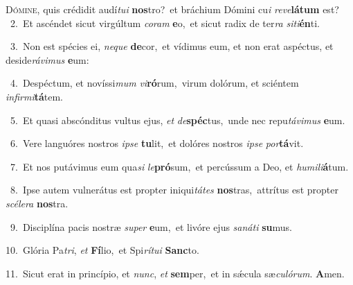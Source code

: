 \lettrine{\initial\textcolor{\initialcolor}{D}}{ómine,} quis crédidit audí\-\textit{tu}\-\textit{i} \textbf{nos}\-tro?~\star et bráchium Dómini cu\textit{i} \textit{re}\-\textit{ve}\textbf{lá}\textbf{tum} est?\\
{\numbfont\textcolor{\numbcolor}{~2.}}~Et ascéndet sicut virgúltum \textit{co}\-\textit{ram} \textbf{e}\-o,~\star et sicut radix de ter\textit{ra} \textit{si}\-\textit{ti}\textbf{én}ti.\par
{\numbfont\textcolor{\numbcolor}{~3.}}~Non est spécies ei, \textit{ne}\-\textit{que} \textbf{de}\-cor,~\star et vídimus eum, et non erat aspéctus, et deside\-\textit{rá}\-\textit{vi}\textit{mus} \textbf{e}\-um:\par
{\numbfont\textcolor{\numbcolor}{~4.}}~Despéctum, et novíssi\textit{mum} \textit{vi}\-\textbf{ró}rum,~\star virum dolórum, et sciéntem \textit{in}\-\textit{fir}\textit{mi}\textbf{tá}tem.\par
{\numbfont\textcolor{\numbcolor}{~5.}}~Et quasi abscónditus vultus ejus, \textit{et} \textit{de}\-\textbf{spéc}tus,~\star unde nec repu\-\textit{tá}\-\textit{vi}\textit{mus} \textbf{e}\-um.\par
{\numbfont\textcolor{\numbcolor}{~6.}}~Vere languóres nostros \textit{ip}\-\textit{se} \textbf{tu}\-lit,~\star et dolóres nostros \textit{ip}\-\textit{se} \textit{por}\-\textbf{tá}vit.\par
{\numbfont\textcolor{\numbcolor}{~7.}}~Et nos putávimus eum qua\textit{si} \textit{le}\-\textbf{pró}sum,~\star et percússum a Deo, et \textit{hu}\-\textit{mi}\textit{li}\textbf{á}tum.\par
{\numbfont\textcolor{\numbcolor}{~8.}}~Ipse autem vulnerátus est propter iniqui\-\textit{tá}\-\textit{tes} \textbf{nos}\-tras,~\star attrítus est propter \textit{scé}\-\textit{le}\textit{ra} \textbf{nos}\-tra.\par
{\numbfont\textcolor{\numbcolor}{~9.}}~Disciplína pacis nostræ \textit{su}\-\textit{per} \textbf{e}\-um,~\star et livóre ejus \textit{sa}\-\textit{ná}\textit{ti} \textbf{su}\-mus.\par
{\numbfont\textcolor{\numbcolor}{10.}}~Glória Pa\-\textit{tri}\-, \textit{et} \textbf{Fí}\-lio,~\star et Spi\-\textit{rí}\-\textit{tu}\textit{i} \textbf{Sanc}\-to.\par
{\numbfont\textcolor{\numbcolor}{11.}}~Sicut erat in princípio, et \textit{nunc}\-, \textit{et} \textbf{sem}\-per,~\star et in sǽcula sæ\-\textit{cu}\-\textit{ló}\textit{rum}. \textbf{A}\-men.\par
